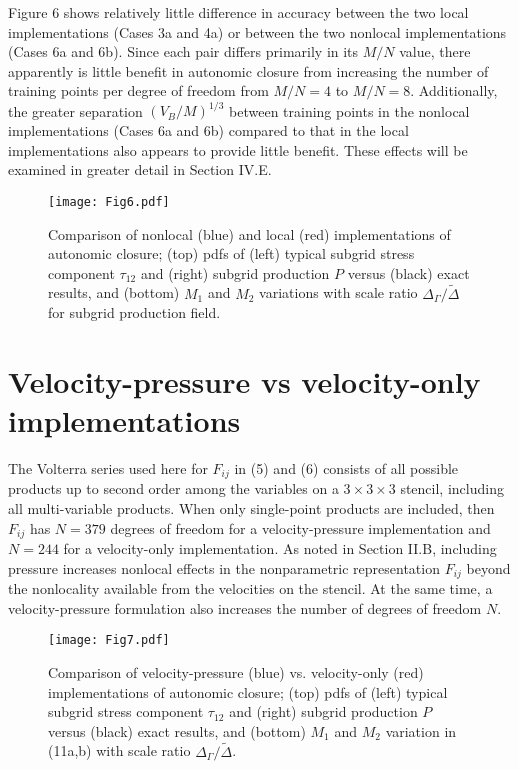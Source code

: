 Figure 6 shows relatively little difference in accuracy between the two local implementations (Cases 3a and 4a) or between the two nonlocal implementations (Cases 6a and 6b). Since each pair differs primarily in its  $M/N$ value, there apparently is little benefit in autonomic closure from increasing the number of training points per degree of freedom from  $M/N = 4$ to  $M/N = 8$. Additionally, the greater separation  $(V_B/M)^{1/3}$ between training points in the nonlocal implementations (Cases 6a and 6b) compared to that in the local implementations also appears to provide little benefit. These effects will be examined in greater detail in Section IV.E.

%
\begin{figure}
	\begin{center}
	\texttt{[image: Fig6.pdf]}
	\caption{ Comparison of nonlocal (blue) and local (red) implementations of autonomic closure; (top) pdfs of (left) typical subgrid stress component $\tau_{12}$ and (right) subgrid production $P$ versus (black) exact results, and (bottom) $M_1$ and $M_2$ variations with scale ratio $\Delta_{\Gamma}/\widetilde{\Delta}$ for subgrid production field. }
	\label{F:6}
	\end{center}
\end{figure}
%
%

\section{Velocity-pressure vs velocity-only implementations}

The Volterra series used here for $F_{ij}$  in (5) and (6) consists of all possible products up to second order among the variables on a  $3 \times 3 \times 3$ stencil, including all multi-variable products. When only single-point products are included, then $F_{ij}$  has $N = 379$ degrees of freedom for a velocity-pressure implementation and $N = 244$ for a velocity-only implementation. As noted in Section II.B, including pressure increases nonlocal effects in the nonparametric representation $F_{ij}$  beyond the nonlocality available from the velocities on the stencil. At the same time, a velocity-pressure formulation also increases the number of degrees of freedom $N$. 

%
\begin{figure}
	\begin{center}
	\texttt{[image: Fig7.pdf]}
	\caption{ Comparison of velocity-pressure (blue) vs. velocity-only (red) implementations of autonomic closure; (top) pdfs of (left) typical subgrid stress component $\tau_{12}$ and (right) subgrid production $P$ versus (black) exact results, and (bottom) $M_1$ and $M_2$ variation in (11a,b) with scale ratio $\Delta_{\Gamma}/\widetilde{\Delta}$. }
	\label{F:7}
	\end{center}
\end{figure}
%
%

